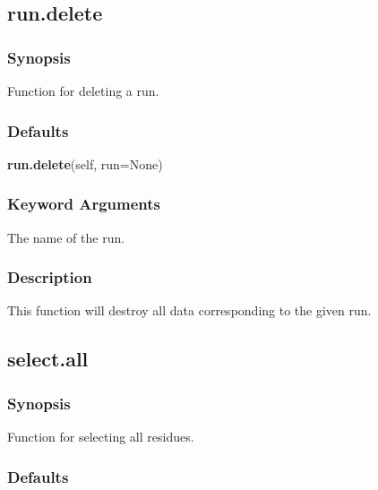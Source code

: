   

 \newpage 

 \subsection{run.delete} 

  
 \subsubsection{Synopsis} 

 Function for deleting a run. 
  

  
 \subsubsection{Defaults} 

 \textsf{\textbf{run.delete}(self, run=None)} 

  
 \subsubsection{Keyword Arguments} 

   The name of the run.  

  

  
 \subsubsection{Description} 

 This function will destroy all data corresponding to the given run. 
  

  

 \newpage 

 \subsection{select.all} 

  
 \subsubsection{Synopsis} 

 Function for selecting all residues. 
  

  
 \subsubsection{Defaults} 

